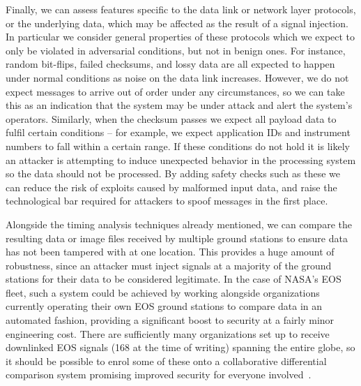 Finally, we can assess features specific to the data link or network layer protocols, or the underlying data, which may be affected as the result of a signal injection.
In particular we consider general properties of these protocols which we expect to only be violated in adversarial conditions, but not in benign ones.
For instance, random bit-flips, failed checksums, and lossy data are all expected to happen under normal conditions as noise on the data link increases.
However, we do not expect messages to arrive out of order under any circumstances, so we can take this as an indication that the system may be under attack and alert the system's operators.
Similarly, when the checksum passes we expect all payload data to fulfil certain conditions -- for example, we expect application IDs and instrument numbers to fall within a certain range.
If these conditions do not hold it is likely an attacker is attempting to induce unexpected behavior in the processing system so the data should not be processed.
By adding safety checks such as these we can reduce the risk of exploits caused by malformed input data, and raise the technological bar required for attackers to spoof messages in the first place.



Alongside the timing analysis techniques already mentioned, we can compare the resulting data or image files received by multiple ground stations to ensure data has not been tampered with at one location.
This provides a huge amount of robustness, since an attacker must inject signals at a majority of the ground stations for their data to be considered legitimate.
In the case of NASA's EOS fleet, such a system could be achieved by working alongside organizations currently operating their own EOS ground stations to compare data in an automated fashion, providing a significant boost to security at a fairly minor engineering cost.
There are sufficiently many organizations set up to receive downlinked EOS signals (168 at the time of writing) spanning the entire globe, so it should be possible to enrol some of these onto a collaborative differential comparison system promising improved security for everyone involved~\cite{nasaDirect}.

